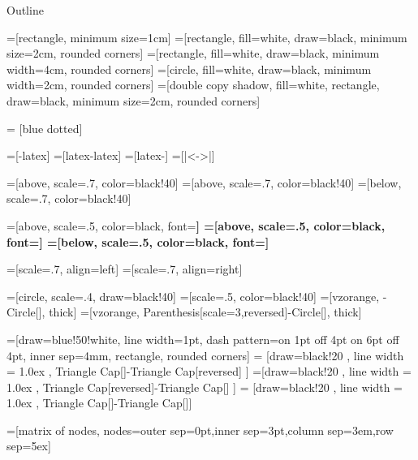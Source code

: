 \documentclass[smaller]{beamer}
\author{Vittorio Zaccaria}
\date{\today}
\title{}
\begin{document}
\begin{frame}{Outline}
\tableofcontents
\end{frame}

=[rectangle, minimum size=1cm]
=[rectangle, fill=white, draw=black, minimum size=2cm, rounded corners]
=[rectangle, fill=white, draw=black, minimum width=4cm, rounded corners]
=[circle, fill=white, draw=black, minimum width=2cm, rounded corners]
=[double copy shadow, fill=white, rectangle, draw=black, minimum size=2cm, rounded corners]

 = [blue dotted]

=[-latex]
=[latex-latex]
=[latex-]
=[|<->|]

     =[above, scale=.7, color=black!40]
=[above, scale=.7, color=black!40]
=[below, scale=.7, color=black!40]

     =[above, scale=.5, color=black, font=\ttfamily\bfseries]
=[above, scale=.5, color=black, font=\ttfamily\bfseries]
=[below, scale=.5, color=black, font=\ttfamily\bfseries]

      =[scale=.7, align=left]
     =[scale=.7, align=right]

=[circle, scale=.4, draw=black!40]
=[scale=.5, color=black!40]
=[vzorange, -{Circle[]}, thick]
=[vzorange, {Parenthesis[scale=3,reversed]}-{Circle[]}, thick]

=[draw=blue!50!white, line width=1pt, dash pattern=on 1pt off 4pt on 6pt off 4pt, inner sep=4mm, rectangle, rounded corners]
= [draw=black!20 , line width = 1.0ex , {Triangle Cap[]}-{Triangle Cap[reversed]} ]
=[draw=black!20 , line width = 1.0ex , {Triangle Cap[reversed]}-{Triangle Cap[]} ]
=   [draw=black!20 , line width = 1.0ex , {Triangle Cap[]}-{Triangle Cap[]}]

=[matrix of nodes, nodes={outer sep=0pt,inner sep=3pt},column sep=3em,row sep=5ex]
\end{document}
